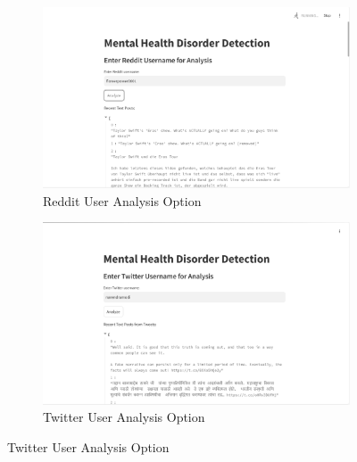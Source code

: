 \begin{figure}[H]
    \centering
    \begin{subfigure}[b]{0.495\textwidth}
        \centering
        \includegraphics[width=\textwidth]{App Images/06 Interface.png}
        \caption*{Reddit User Analysis Option}
        \label{fig:07i}
    \end{subfigure}
    \hfill
    \begin{subfigure}[b]{0.495\textwidth}
        \centering
        \includegraphics[width=\textwidth]{App Images/08 Interface.png}
        \caption*{Twitter User Analysis Option}
        \label{fig:09i}
    \end{subfigure}
    \label{fig:reddit_twitter_analysis}
\end{figure}

\pagebreak

